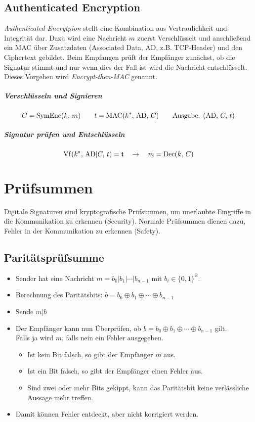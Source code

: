 \subsection{Authenticated Encryption}
\textit{Authenticated Encrytpion} stellt eine Kombination aus Vertraulichkeit und Integrität dar. Dazu wird eine Nachricht \(m\) zuerst Verschlüsselt und anschließend ein MAC über Zusatzdaten (Associated Data, AD, z.B. TCP-Header) und den Ciphertext gebildet. Beim Empfangen prüft der Empfänger zunächst, ob die Signatur stimmt und nur wenn dies der Fall ist wird die Nachricht entschlüsselt. Dieses Vorgehen wird \textit{Encrypt-then-MAC} genannt.

\subparagraph{Verschlüsseln und Signieren}
	\begin{equation*}
		C = \text{SymEnc}(k,\, m) \qquad t = \operatorname{MAC}(k^*,\, \textrm{AD},\, C) \qquad \textrm{Ausgabe: } (\textrm{AD},\, C,\, t)
	\end{equation*}

	\subparagraph{Signatur prüfen und Entschlüsseln}
		\begin{equation*}
			\operatorname{Vf}(k^*,\, \textrm{AD} \vert C,\, t) = \mathfrak{t} \quad\rightarrow\quad m = \operatorname{Dec}(k,\, C)
		\end{equation*}

\section{Prüfsummen}
	Digitale Signaturen sind kryptografische Prüfsummen, um unerlaubte Eingriffe in die Kommunikation zu erkennen (Security). Normale Prüfsummen dienen dazu, Fehler in der Kommunikation zu erkennen (Safety).

	\subsection{Paritätsprüfsumme}
		\begin{itemize}
			\item Sender hat eine Nachricht \( m = b_0 \vert b_1 \vert \cdots \vert b_{n - 1} \) mit \( b_i \in \{0,1\}^\mathbb{B} \).
			\item Berechnung des Paritätsbits: \( b = b_0 \oplus b_1 \oplus \cdots \oplus b_{n-1} \)
			\item Sende \( m \vert b \)
			\item Der Empfänger kann nun Überprüfen, ob \( b = b_0 \oplus b_1 \oplus \cdots \oplus b_{n-1} \) gilt. \\ Falls ja wird \(m\), falls nein ein Fehler ausgegeben.
				\begin{itemize}
					\item Ist kein Bit falsch, so gibt der Empfänger \(m\) aus.
					\item Ist ein Bit falsch, so gibt der Empfänger einen Fehler aus.
					\item Sind zwei oder mehr Bits gekippt, kann das Paritätsbit keine verlässliche Aussage mehr treffen.
				\end{itemize}
			\item Damit können Fehler entdeckt, aber nicht korrigiert werden.
		\end{itemize}

